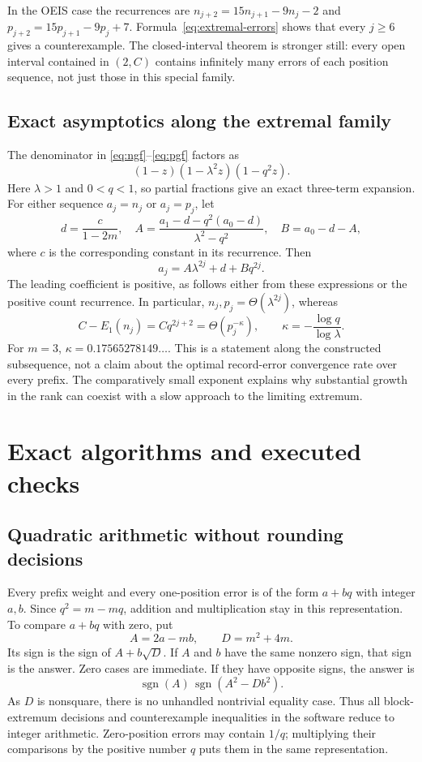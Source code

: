 \documentclass[11pt]{article}
\numberwithin{equation}{section}
\theoremstyle{definition}
\theoremstyle{remark}
\newcommand{\sgn}{\operatorname{sgn}}
\begin{document}
In the OEIS case the recurrences are
$n_{j+2}=15n_{j+1}-9n_j-2$ and
$p_{j+2}=15p_{j+1}-9p_j+7$. Formula~\eqref{eq:extremal-errors} shows
that every $j\ge6$ gives a counterexample. The closed-interval theorem is
stronger still: every open interval contained in $(2,C)$ contains infinitely
many errors of each position sequence, not just those in this special
family.

\subsection{Exact asymptotics along the extremal family}
The denominator in \eqref{eq:ngf}--\eqref{eq:pgf} factors as
\[
(1-z)(1-\lambda^2z)(1-q^2z).
\]
Here $\lambda>1$ and $0<q<1$, so partial fractions give an exact
three-term expansion. For either sequence $a_j=n_j$ or $a_j=p_j$, let
\[
d=\frac{c}{1-2m},\quad
A=\frac{a_1-d-q^2(a_0-d)}{\lambda^2-q^2},\quad B=a_0-d-A,
\]
where $c$ is the corresponding constant in its recurrence. Then
\begin{equation}\label{eq:exact-expansion}
a_j=A\lambda^{2j}+d+Bq^{2j}.
\end{equation}
The leading coefficient is positive, as follows either from these
expressions or the positive count recurrence. In particular,
$n_j,p_j=\Theta(\lambda^{2j})$, whereas
\begin{equation}\label{eq:gap-rate}
C-E_1(n_j)=Cq^{2j+2}=\Theta(p_j^{-\kappa}),\qquad
\kappa=-\frac{\log q}{\log\lambda}.
\end{equation}
For $m=3$, $\kappa=0.17565278149\ldots$. This is a statement along the
constructed subsequence, not a claim about the optimal record-error
convergence rate over every prefix. The comparatively small exponent
explains why substantial growth in the rank can coexist with a slow
approach to the limiting extremum.

\section{Exact algorithms and executed checks}\label{sec:algorithms}

\subsection{Quadratic arithmetic without rounding decisions}
Every prefix weight and every one-position error is of the form $a+bq$
with integer $a,b$. Since $q^2=m-mq$, addition and multiplication stay
in this representation. To compare $a+bq$ with zero, put
\[
A=2a-mb,\qquad D=m^2+4m.
\]
Its sign is the sign of $A+b\sqrt D$. If $A$ and $b$ have the same
nonzero sign, that sign is the answer. Zero cases are immediate. If
they have opposite signs, the answer is
\begin{equation}\label{eq:sign-rule}
\sgn(A)\,\sgn(A^2-Db^2).
\end{equation}
As $D$ is nonsquare, there is no unhandled nontrivial equality case.
Thus all block-extremum decisions and counterexample inequalities in the
software reduce to integer arithmetic. Zero-position errors may contain
$1/q$; multiplying their comparisons by the positive number $q$ puts
them in the same representation.
\end{document}
